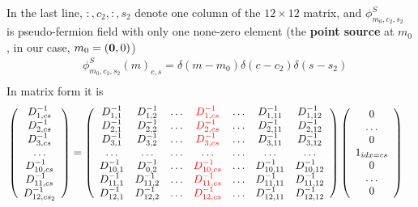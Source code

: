 In the last line, $:,c_2,:,s_2$ denote one column of the $12\times 12$ matrix, and $\phi ^{S}_{m_0,c_2,s_2}$ is pseudo-fermion field with only one none-zero element (the \textbf{point source} at $m_0$, in our case, $m_0=({\bf 0},0)$)
\begin{equation}
\begin{split}
&\phi ^{S}_{m_0,c_2,s_2}(m)_{c,s}=\delta (m-m_0)\delta (c-c_2)\delta (s-s_2)\\
\end{split}
\end{equation}
In matrix form it is
\begin{equation}
\begin{split}
&\left(\begin{array}{c} D^{-1}_{1,cs} \\ D^{-1}_{2,cs} \\ D^{-1}_{3,cs} \\ \ldots \\ D^{-1}_{10,cs}\\ D^{-1}_{11,cs} \\ D^{-1}_{12,cs_2}\end{array}\right)=\left(\begin{array}{ccccccc} 
D^{-1}_{1,1} & D^{-1}_{1,2} & \ldots & \textcolor[rgb]{1,0,0}{D^{-1}_{1,cs}} & \ldots &  D^{-1}_{1,11} & D^{-1}_{1,12} \\
D^{-1}_{2,1} & D^{-1}_{2,2} & \ldots & \textcolor[rgb]{1,0,0}{D^{-1}_{2,cs}} & \ldots &  D^{-1}_{2,11} & D^{-1}_{2,12} \\
D^{-1}_{3,1} & D^{-1}_{3,2} & \ldots & \textcolor[rgb]{1,0,0}{D^{-1}_{3,cs}} & \ldots &  D^{-1}_{3,11} & D^{-1}_{3,12} \\
\ldots & \ldots & \ldots & \ldots & \ldots &  \ldots & \ldots \\
D^{-1}_{10,1} & D^{-1}_{0,2} & \ldots & \textcolor[rgb]{1,0,0}{D^{-1}_{10,cs}} & \ldots &  D^{-1}_{10,11} & D^{-1}_{10,12} \\
D^{-1}_{11,1} & D^{-1}_{11,2} & \ldots & \textcolor[rgb]{1,0,0}{D^{-1}_{11,cs}} & \ldots &  D^{-1}_{11,11} & D^{-1}_{11,12} \\
D^{-1}_{12,1} & D^{-1}_{12,2} & \ldots & \textcolor[rgb]{1,0,0}{D^{-1}_{12,cs}} & \ldots &  D^{-1}_{12,11} & D^{-1}_{12,12} \\
 \end{array}\right)\left(\begin{array}{c} 0\\ \ldots \\ 0 \\ 1 _{idx=cs}\\ 0 \\ \ldots \\ 0 \end{array}\right)
\end{split}
\label{eq.mesoncorrelator.matrix1}
\end{equation}

